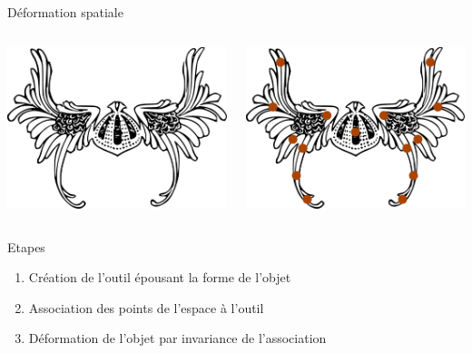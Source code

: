 \documentclass[xcolor=x11names,compress]{beamer}
\renewcommand{\(}{\begin{columns}} \renewcommand{\)}{\end{columns}}
\newcommand{\<}[1]{\begin{column}{#1}} \renewcommand{\>}{\end{column}}
\begin{document}
\begin{frame}{Déformation spatiale}
\begin{columns}[t]
  \begin{column}{0.5\textwidth}
    \includegraphics[scale=0.16]{Outil-Mono-Sans}
  \end{column}
  \pause
  \begin{column}{0.5\textwidth}
    \includegraphics[scale=0.16]{Outil-Mono-Points}
  \end{column}
\end{columns}
\pause
\begin{block}{Etapes}
\begin{enumerate}
  \item Création de l'outil épousant la forme de l'objet
  \item Association des points de l'espace à l'outil
  \item Déformation de l'objet par invariance de l'association
\end{enumerate}
\end{block}
\end{frame}
\end{document}
